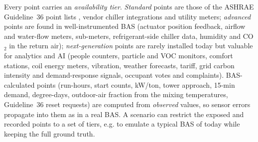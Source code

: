 \documentclass[preprint,12pt,authoryear=false]{elsarticle}
\begin{document}
Every point carries an \emph{availability tier}. \emph{Standard} points are those of the ASHRAE Guideline~36 point
lists \cite{ashrae2021g36}, vendor chiller integrations and utility meters; \emph{advanced} points are found in
well-instrumented BAS (actuator position feedback, airflow and water-flow meters, sub-meters, refrigerant-side chiller
data, humidity and CO$_2$ in the return air); \emph{next-generation} points are rarely installed today but valuable for
analytics and AI (people counters, particle and VOC monitors, comfort stations, coil energy meters, vibration, weather
forecasts, tariff, grid carbon intensity and demand-response signals, occupant votes and complaints). BAS-calculated
points (run-hours, start counts, kW/ton, tower approach, 15-min demand, degree-days, outdoor-air fraction from the
mixing temperatures, Guideline~36 reset requests) are computed from \emph{observed} values, so sensor errors propagate
into them as in a real BAS. A scenario can restrict the exposed and recorded points to a set of tiers, e.g. to emulate
a typical BAS of today while keeping the full ground truth.
\end{document}
